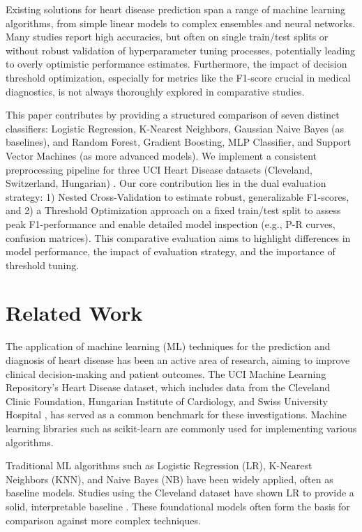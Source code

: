 \documentclass{article}
\begin{document}
Existing solutions for heart disease prediction span a range of machine learning algorithms, from simple linear models to complex ensembles and neural networks. Many studies report high accuracies, but often on single train/test splits or without robust validation of hyperparameter tuning processes, potentially leading to overly optimistic performance estimates. Furthermore, the impact of decision threshold optimization, especially for metrics like the F1-score crucial in medical diagnostics, is not always thoroughly explored in comparative studies.

This paper contributes by providing a structured comparison of seven distinct classifiers: Logistic Regression, K-Nearest Neighbors, Gaussian Naive Bayes (as baselines), and Random Forest, Gradient Boosting, MLP Classifier, and Support Vector Machines (as more advanced models). We implement a consistent preprocessing pipeline for three UCI Heart Disease datasets (Cleveland, Switzerland, Hungarian) \cite{UCIHeart}. Our core contribution lies in the dual evaluation strategy: 1) Nested Cross-Validation to estimate robust, generalizable F1-scores, and 2) a Threshold Optimization approach on a fixed train/test split to assess peak F1-performance and enable detailed model inspection (e.g., P-R curves, confusion matrices). This comparative evaluation aims to highlight differences in model performance, the impact of evaluation strategy, and the importance of threshold tuning.

\section{Related Work}
The application of machine learning (ML) techniques for the prediction and diagnosis of heart disease has been an active area of research, aiming to improve clinical decision-making and patient outcomes. The UCI Machine Learning Repository's Heart Disease dataset, which includes data from the Cleveland Clinic Foundation, Hungarian Institute of Cardiology, and Swiss University Hospital \cite{UCIHeart}, has served as a common benchmark for these investigations. Machine learning libraries such as scikit-learn \cite{scikit-learn} are commonly used for implementing various algorithms.

Traditional ML algorithms such as Logistic Regression (LR), K-Nearest Neighbors (KNN), and Naive Bayes (NB) have been widely applied, often as baseline models. Studies using the Cleveland dataset have shown LR to provide a solid, interpretable baseline \cite{Paul2021}. These foundational models often form the basis for comparison against more complex techniques.
\end{document}
